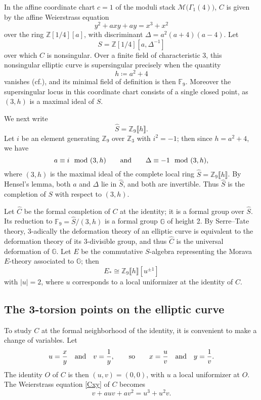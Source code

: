 \documentclass{gtpart}
\theoremstyle{definition}
\theoremstyle{remark}
\newcommand{\mb}[1]{\mathbb{#1}}
\newcommand{\cf}{cf.\thinspace}
\newcommand{\BF}{{\mb F}}
\newcommand{\BG}{{\mb G}}
\newcommand{\BZ}{{\mb Z}}
\newcommand{\CM}{{\mathscr{M}}}
\newcommand{\HC}{\widehat{C}}
\newcommand{\HS}{\widehat{S}}
\newcommand{\md}{~~{\rm mod}~}
\newcommand{\ad}{{\rm and}}
\newcommand{\G}{\Gamma}
\begin{document}
In the affine coordinate chart $c = 1$ of the moduli stack $\CM \big(\G_1(4)\big)$, 
$C$ is given by the affine Weierstrass equation 
\begin{equation}
\label{Cxy}
 y^2 + a x y + a y = x^3 + x^2 
\end{equation}
over the ring $\BZ [1/4] [a]$, with discriminant $\Delta = a^2 (a + 4) (a - 4)$.  
Let 
\[
 S = \BZ [1/4] [a, \Delta^{-1}] 
\]
over which $C$ is nonsingular.  
Over a finite field of characteristic 3, this nonsingular elliptic curve is supersingular precisely when the quantity 
\begin{equation}
\label{h}
 h \coloneqq a^2 + 4 
\end{equation}
vanishes (\cf \cite[V.4.1a]{AEC}), and its minimal field of definition is then $\BF_9$.  
Moreover the supersingular locus in this coordinate chart consists of a single closed point, as $(3,h)$ is a maximal ideal of $S$.  

We next write 
\[
 \HS = \BZ_9 \llbracket h \rrbracket.  
\]
Let $i$ be an element generating $\BZ_9$ over $\BZ_3$ with $i^2 = -1$; then since $h = a^2 + 4$, we have 
\[
 a \equiv i \md (3,h) \qquad \ad \qquad \Delta \equiv -1 \md (3,h), 
\]
where $(3,h)$ is the maximal ideal of the complete local ring $\HS = \BZ_9 \llbracket h \rrbracket$.  
By Hensel's lemma, both $a$ and $\Delta$ lie in $\HS$, and both are invertible.  
Thus $\HS$ is the completion of $S$ with respect to $(3,h)$.  

Let $\HC$ be the formal completion of $C$ at the identity; it is a formal group over $\HS$.  
Its reduction to $\BF_9 = \HS / (3,h)$ is a formal group $\BG$ of height 2.  
By Serre--Tate theory, 3-adically the deformation theory of an elliptic curve is equivalent to the deformation theory of its 3-divisible group, 
and thus $\HC$ is the universal deformation of $\BG$.  
Let $E$ be the commutative $S$-algebra representing the Morava $E$-theory associated to $\BG$; then 
\[
 E_* \cong \BZ_9 \llbracket h \rrbracket [u^{\pm 1}] 
\]
with $|u| = 2$, where $u$ corresponds to a local uniformizer at the identity of $C$.  


\subsection{The 3-torsion points on the elliptic curve}

To study $C$ at the formal neighborhood of the identity, it is convenient to make a change of variables.  
Let 
\[
 u = \frac{x}{y} \quad \ad \quad v = \frac{1}{y}, \qquad \text{so} \qquad x = \frac{u}{v} \quad \ad \quad y = \frac{1}{v}.  
\]
The identity $O$ of $C$ is then $(u,v) = (0,0)$, with $u$ a local uniformizer at $O$.  
The Weierstrass equation \eqref{Cxy} of $C$ becomes 
\begin{equation}
\label{Cuv}
 v + a u v + a v^2 = u^3 + u^2 v.  
\end{equation}
\end{document}
